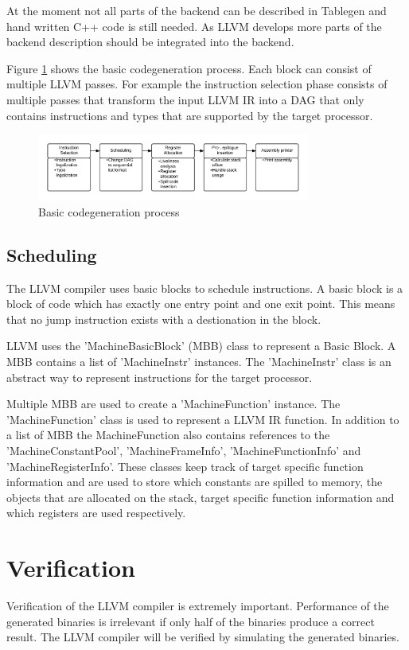 At the moment not all parts of the backend can be described in Tablegen and hand written C++ code is still needed. As LLVM develops more parts of the backend description should be integrated into the backend. 

Figure \ref{fig:codegen_process} shows the basic codegeneration process. Each block can consist of multiple LLVM passes. For example the instruction selection phase consists of multiple passes that transform the input LLVM IR into a DAG that only contains instructions and types that are supported by the target processor.
\begin{figure}[ht]
\centering
\includegraphics[width=0.8\textwidth]{2_background/img/Codegen.png}
\caption{Basic codegeneration process}
\label{fig:codegen_process}
\end{figure}

\subsection{Scheduling} %
\label{sub:scheduling}
The LLVM compiler uses basic blocks to schedule instructions. A basic block is a block of code which has exactly one entry point and one exit point. This means that no jump instruction exists with a destionation in the block. 

LLVM uses the 'MachineBasicBlock' (MBB) class to represent a Basic Block. A MBB contains a list of 'MachineInstr' instances. The 'MachineInstr' class is an abstract way to represent instructions for the target processor.

Multiple MBB are used to create a 'MachineFunction' instance. The 'MachineFunction' class is used to represent a LLVM IR function. In addition to a list of MBB the MachineFunction also contains references to the 'MachineConstantPool', 'MachineFrameInfo', 'MachineFunctionInfo' and 'MachineRegisterInfo'. These classes keep track of target specific function information and are used to store which constants are spilled to memory, the objects that are allocated on the stack, target specific function information and which registers are used respectively. 



\section{Verification}
Verification of the LLVM compiler is extremely important. Performance of the generated binaries is irrelevant if only half of the binaries produce a correct result. The LLVM compiler will be verified by simulating the generated binaries. 

